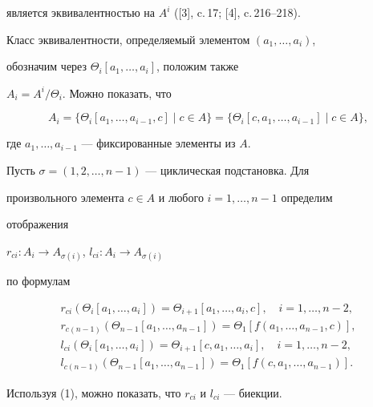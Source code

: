 является эквивалентностью на $A^i$ ([3], c.\,17; [4], c.\,216--218).


Класс эквивалентности, определяемый элементом $(a_1,\dotsc,a_i)$,


обозначим через $\Theta_i[a_1,\dotsc,a_i]$, положим также


$A_i = A^i/\Theta_i$. Можно показать, что


\begin{equation}


A_i=\{\Theta_i[a_1,\dotsc,a_{i-1},c]\mid c\in A\} =


\{\Theta_i [c,a_1,\dotsc,a_{i-1}] \mid c\in A\},


\end{equation}


где $a_1,\dotsc, a_{i-1}$ --- фиксированные элементы из $A$.





Пусть $\sigma = (1,2,\dotsc,n-1)$ --- циклическая подстановка. Для


произвольного элемента $c\in A$ и любого $i = 1,\dotsc,n-1$ определим


отображения


$r_{ci}: A_i\to A_{\sigma(i)}$, $l_{ci}: A_i\to A_{\sigma(i)}$


по формулам


\begin{gather*}


r_{ci}(\Theta_i [a_1,\dotsc,a_i]) = \Theta_{i+1}


[a_1,\dotsc,a_i,c],\quad i = 1,\dotsc, n-2, \\


%


r_{c(n-1)}(\Theta_{n-1}[a_1,\dotsc,a_{n-1}]) = \Theta_1


[f(a_1,\dotsc,a_{n-1},c)], \\


%


l_{ci}(\Theta_i [a_1,\dotsc,a_i]) = \Theta_{i+1} [c,a_1,\dotsc,a_i],


\quad i = 1,\dotsc, n-2, \\


%


l_{c(n-1)}(\Theta_{n-1} [a_1,\dotsc,a_{n-1}]) = \Theta_1


[f(c,a_1,\dotsc,a_{n-1})].


\end{gather*}


Используя (1), можно показать, что $r_{ci}$ и $l_{ci}$ --- биекции.





